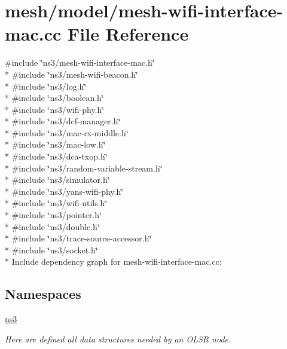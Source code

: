 \hypertarget{mesh-wifi-interface-mac_8cc}{}\section{mesh/model/mesh-\/wifi-\/interface-\/mac.cc File Reference}
\label{mesh-wifi-interface-mac_8cc}
{\ttfamily \#include \char`\"{}ns3/mesh-\/wifi-\/interface-\/mac.\+h\char`\"{}}\\*
{\ttfamily \#include \char`\"{}ns3/mesh-\/wifi-\/beacon.\+h\char`\"{}}\\*
{\ttfamily \#include \char`\"{}ns3/log.\+h\char`\"{}}\\*
{\ttfamily \#include \char`\"{}ns3/boolean.\+h\char`\"{}}\\*
{\ttfamily \#include \char`\"{}ns3/wifi-\/phy.\+h\char`\"{}}\\*
{\ttfamily \#include \char`\"{}ns3/dcf-\/manager.\+h\char`\"{}}\\*
{\ttfamily \#include \char`\"{}ns3/mac-\/rx-\/middle.\+h\char`\"{}}\\*
{\ttfamily \#include \char`\"{}ns3/mac-\/low.\+h\char`\"{}}\\*
{\ttfamily \#include \char`\"{}ns3/dca-\/txop.\+h\char`\"{}}\\*
{\ttfamily \#include \char`\"{}ns3/random-\/variable-\/stream.\+h\char`\"{}}\\*
{\ttfamily \#include \char`\"{}ns3/simulator.\+h\char`\"{}}\\*
{\ttfamily \#include \char`\"{}ns3/yans-\/wifi-\/phy.\+h\char`\"{}}\\*
{\ttfamily \#include \char`\"{}ns3/wifi-\/utils.\+h\char`\"{}}\\*
{\ttfamily \#include \char`\"{}ns3/pointer.\+h\char`\"{}}\\*
{\ttfamily \#include \char`\"{}ns3/double.\+h\char`\"{}}\\*
{\ttfamily \#include \char`\"{}ns3/trace-\/source-\/accessor.\+h\char`\"{}}\\*
{\ttfamily \#include \char`\"{}ns3/socket.\+h\char`\"{}}\\*
Include dependency graph for mesh-\/wifi-\/interface-\/mac.cc\+:
\subsection*{Namespaces}
\begin{DoxyCompactItemize}
\item 
 \hyperlink{namespacens3}{ns3}
\begin{DoxyCompactList}\small\item\em Here are defined all data structures needed by an O\+L\+SR node. \end{DoxyCompactList}\end{DoxyCompactItemize}
